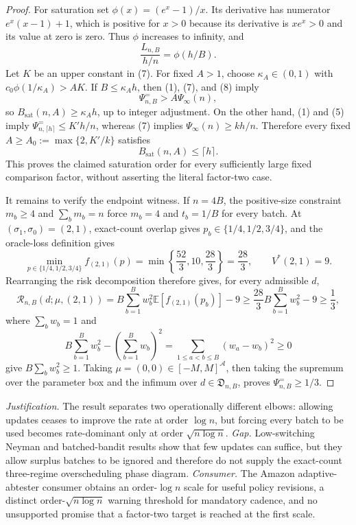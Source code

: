 \documentclass{article}
\begin{document}
\begin{proof}
For saturation set \(\phi(x)=(e^x-1)/x\). Its derivative has numerator \(e^x(x-1)+1\), which is positive for \(x>0\) because its derivative is \(xe^x>0\) and its value at zero is zero. Thus \(\phi\) increases to infinity, and
\[
\frac{L_{n,B}}{h/n}=\phi(h/B).                       \tag{8}
\]
Let \(K\) be an upper constant in (7). For fixed \(A>1\), choose \(\kappa_A\in(0,1)\) with \(c_0\phi(1/\kappa_A)>AK\). If \(B\leq\kappa_Ah\), then (1), (7), and (8) imply
\[
\Psi^{=}_{n,B}>A\Psi_\infty(n),                    \tag{9}
\]
so \(B_{\mathrm{sat}}(n,A)\geq\kappa_Ah\), up to integer adjustment. On the other hand, (1) and (5) imply
\(\Psi^{=}_{n,\lceil h\rceil}\leq K'h/n\), whereas (7) implies
\(\Psi_\infty(n)\geq kh/n\). Therefore every fixed
\(A\geq A_0:=\max\{2,K'/k\}\) satisfies
\[
B_{\mathrm{sat}}(n,A)\leq\lceil h\rceil.           \tag{10}
\]
This proves the claimed saturation order for every sufficiently large fixed comparison factor, without asserting the literal factor-two case.

It remains to verify the endpoint witness. If \(n=4B\), the positive-size constraint \(m_b\geq4\) and \(\sum_bm_b=n\) force \(m_b=4\) and \(t_b=1/B\) for every batch. At \((\sigma_1,\sigma_0)=(2,1)\), exact-count overlap gives \(p_b\in\{1/4,1/2,3/4\}\), and the oracle-loss definition gives
\[
\min_{p\in\{1/4,1/2,3/4\}}f_{(2,1)}(p)
=\min\left\{\frac{52}{3},10,\frac{28}{3}\right\}
=\frac{28}{3},
\qquad V^*(2,1)=9.                                  \tag{11}
\]
Rearranging the risk decomposition therefore gives, for every admissible \(d\),
\[
\mathcal R_{n,B}(d;\mu,(2,1))
=B\sum_{b=1}^Bw_b^2\mathbb E[f_{(2,1)}(p_b)]-9
\geq\frac{28}{3}B\sum_{b=1}^Bw_b^2-9
\geq\frac13,                                        \tag{12}
\]
where \(\sum_bw_b=1\) and
\[
B\sum_{b=1}^Bw_b^2-\left(\sum_{b=1}^Bw_b\right)^2
=\sum_{1\leq a<b\leq B}(w_a-w_b)^2\geq0
\]
give \(B\sum_bw_b^2\geq1\). Taking \(\mu=(0,0)\in[-M,M]^{\mathcal A}\), then taking the supremum over the parameter box and the infimum over \(d\in\mathfrak D_{n,B}\), proves \(\Psi^{=}_{n,B}\geq1/3\).
\end{proof}
\par\smallskip\noindent \textit{Justification.} The result separates two operationally different elbows: allowing updates ceases to improve the rate at order \(\log n\), but forcing every batch to be used becomes rate-dominant only at order \(\sqrt{n\log n}\). \textit{Gap.} Low-switching Neyman and batched-bandit results show that few updates can suffice, but they allow surplus batches to be ignored and therefore do not supply the exact-count three-regime overscheduling phase diagram. \textit{Consumer.} The Amazon adaptive-abtester consumer obtains an order-\(\log n\) scale for useful policy revisions, a distinct order-\(\sqrt{n\log n}\) warning threshold for mandatory cadence, and no unsupported promise that a factor-two target is reached at the first scale.
\end{document}

